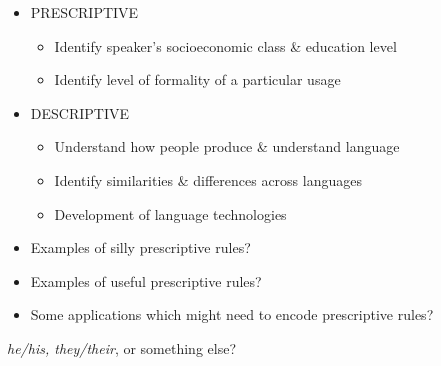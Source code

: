 \documentclass[a4paper,landscape,headrule,footrule]{foils}
\begin{document}

\begin{itemize}
\item PRESCRIPTIVE
  \begin{itemize}
  \item Identify speaker’s
    socioeconomic class
    \& education level
  \item Identify level of
    formality of a
    particular usage
  \end{itemize}
\item DESCRIPTIVE
  \begin{itemize}
  \item Understand how
    people produce \&
    understand language
  \item Identify similarities
    \& differences across
    languages
  \item Development of
    language technologies
  \end{itemize}
\end{itemize}

\begin{itemize}
\item Examples of silly prescriptive rules?
\\ 
\item Examples of useful prescriptive rules?
\\ 
\item Some applications which might need to encode prescriptive rules?
\\ 
\end{itemize}

\textit{he/his, they/their}, or something else?


\begin{exe}
\ex {}
\ex  {}
\ex  {}
\ex  {}
\ex  {}
\end{exe}
\end{document}

